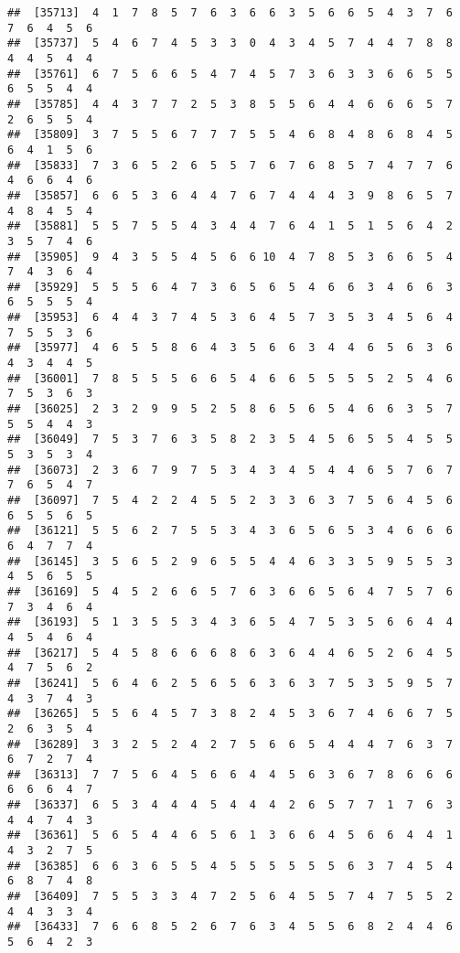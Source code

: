 \documentclass[
]{book}
\begin{document}
\begin{verbatim}
##  [35713]  4  1  7  8  5  7  6  3  6  6  3  5  6  6  5  4  3  7  6  7  6  4  5  6
##  [35737]  5  4  6  7  4  5  3  3  0  4  3  4  5  7  4  4  7  8  8  4  4  5  4  4
##  [35761]  6  7  5  6  6  5  4  7  4  5  7  3  6  3  3  6  6  5  5  6  5  5  4  4
##  [35785]  4  4  3  7  7  2  5  3  8  5  5  6  4  4  6  6  6  5  7  2  6  5  5  4
##  [35809]  3  7  5  5  6  7  7  7  5  5  4  6  8  4  8  6  8  4  5  6  4  1  5  6
##  [35833]  7  3  6  5  2  6  5  5  7  6  7  6  8  5  7  4  7  7  6  4  6  6  4  6
##  [35857]  6  6  5  3  6  4  4  7  6  7  4  4  4  3  9  8  6  5  7  4  8  4  5  4
##  [35881]  5  5  7  5  5  4  3  4  4  7  6  4  1  5  1  5  6  4  2  3  5  7  4  6
##  [35905]  9  4  3  5  5  4  5  6  6 10  4  7  8  5  3  6  6  5  4  7  4  3  6  4
##  [35929]  5  5  5  6  4  7  3  6  5  6  5  4  6  6  3  4  6  6  3  6  5  5  5  4
##  [35953]  6  4  4  3  7  4  5  3  6  4  5  7  3  5  3  4  5  6  4  7  5  5  3  6
##  [35977]  4  6  5  5  8  6  4  3  5  6  6  3  4  4  6  5  6  3  6  4  3  4  4  5
##  [36001]  7  8  5  5  5  6  6  5  4  6  6  5  5  5  5  2  5  4  6  7  5  3  6  3
##  [36025]  2  3  2  9  9  5  2  5  8  6  5  6  5  4  6  6  3  5  7  5  5  4  4  3
##  [36049]  7  5  3  7  6  3  5  8  2  3  5  4  5  6  5  5  4  5  5  5  3  5  3  4
##  [36073]  2  3  6  7  9  7  5  3  4  3  4  5  4  4  6  5  7  6  7  7  6  5  4  7
##  [36097]  7  5  4  2  2  4  5  5  2  3  3  6  3  7  5  6  4  5  6  6  5  5  6  5
##  [36121]  5  5  6  2  7  5  5  3  4  3  6  5  6  5  3  4  6  6  6  6  4  7  7  4
##  [36145]  3  5  6  5  2  9  6  5  5  4  4  6  3  3  5  9  5  5  3  4  5  6  5  5
##  [36169]  5  4  5  2  6  6  5  7  6  3  6  6  5  6  4  7  5  7  6  7  3  4  6  4
##  [36193]  5  1  3  5  5  3  4  3  6  5  4  7  5  3  5  6  6  4  4  4  5  4  6  4
##  [36217]  5  4  5  8  6  6  6  8  6  3  6  4  4  6  5  2  6  4  5  4  7  5  6  2
##  [36241]  5  6  4  6  2  5  6  5  6  3  6  3  7  5  3  5  9  5  7  4  3  7  4  3
##  [36265]  5  5  6  4  5  7  3  8  2  4  5  3  6  7  4  6  6  7  5  2  6  3  5  4
##  [36289]  3  3  2  5  2  4  2  7  5  6  6  5  4  4  4  7  6  3  7  6  7  2  7  4
##  [36313]  7  7  5  6  4  5  6  6  4  4  5  6  3  6  7  8  6  6  6  6  6  6  4  7
##  [36337]  6  5  3  4  4  4  5  4  4  4  2  6  5  7  7  1  7  6  3  4  4  7  4  3
##  [36361]  5  6  5  4  4  6  5  6  1  3  6  6  4  5  6  6  4  4  1  4  3  2  7  5
##  [36385]  6  6  3  6  5  5  4  5  5  5  5  5  5  6  3  7  4  5  4  6  8  7  4  8
##  [36409]  7  5  5  3  3  4  7  2  5  6  4  5  5  7  4  7  5  5  2  4  4  3  3  4
##  [36433]  7  6  6  8  5  2  6  7  6  3  4  5  5  6  8  2  4  4  6  5  6  4  2  3

\end{verbatim}
\end{document}
